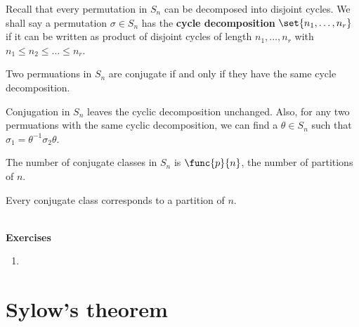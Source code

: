 Recall that every permutation in \(S_n\) can be decomposed into disjoint cycles. We shall say a permutation \(\sigma \in S_n\) has the \textbf{cycle decomposition} \(\set{n_1, \dots , n_r}\) if it can be written as product of disjoint cycles of length \(n_1, \dots ,n _r\) with \(n_1 \leq n_2 \leq \dots \leq n_r\).

\begin{lemma}
    Two permuations in \(S_n\) are conjugate if and only if they have the same cycle decomposition.
\end{lemma}

\begin{prooflemma}
    Conjugation in \(S_n\) leaves the cyclic decomposition unchanged. Also, for any two permuations with the same cyclic decomposition, we can find a \(\theta \in S_n\) such that \(\sigma_1 = \theta^{-1} \sigma_2 \theta\).
\end{prooflemma}
\begin{corollary}
    The number of conjugate classes in \(S_n\) is \(\func{p}{n}\), the number of partitions of \(n\).
\end{corollary}
\begin{prooflemma}
    Every conjugate class corresponds to a partition of \(n\).
\end{prooflemma}

\ \\ 
{\Large{\textbf{Exercises}}}
\begin{enumerate}
    \item 
\end{enumerate}
\section{Sylow's theorem}

